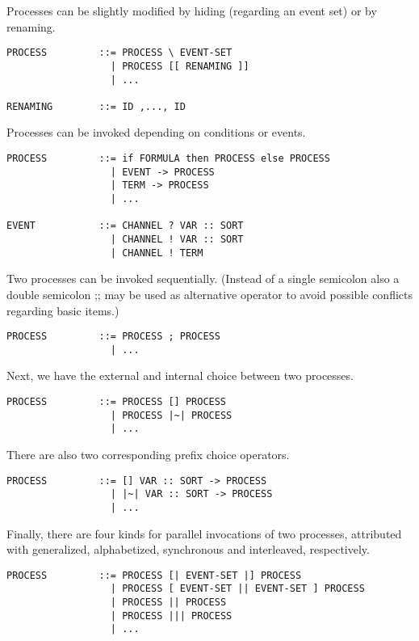 \documentclass{article}
\begin{document}
Processes can be slightly modified by hiding (regarding an event set) or by
renaming.

\begin{verbatim}
PROCESS         ::= PROCESS \ EVENT-SET
                  | PROCESS [[ RENAMING ]]
                  | ...

RENAMING        ::= ID ,..., ID
\end{verbatim}

Processes can be invoked depending on conditions or events.

\begin{verbatim}
PROCESS         ::= if FORMULA then PROCESS else PROCESS
                  | EVENT -> PROCESS
                  | TERM -> PROCESS
                  | ...

EVENT           ::= CHANNEL ? VAR :: SORT
                  | CHANNEL ! VAR :: SORT
                  | CHANNEL ! TERM
\end{verbatim}

Two processes can be invoked sequentially. (Instead of a single semicolon also
a double semicolon ;; may be used as alternative operator to avoid possible
conflicts regarding basic items.)

\begin{verbatim}
PROCESS         ::= PROCESS ; PROCESS
                  | ...
\end{verbatim}

Next, we have the external and internal choice between two processes.

\begin{verbatim}
PROCESS         ::= PROCESS [] PROCESS
                  | PROCESS |~| PROCESS
                  | ...
\end{verbatim}

There are also two corresponding prefix choice operators.
\begin{verbatim}
PROCESS         ::= [] VAR :: SORT -> PROCESS
                  | |~| VAR :: SORT -> PROCESS
                  | ...
\end{verbatim}

Finally, there are four kinds for parallel invocations of two processes,
attributed with generalized, alphabetized, synchronous and interleaved,
respectively.

\begin{verbatim}
PROCESS         ::= PROCESS [| EVENT-SET |] PROCESS
                  | PROCESS [ EVENT-SET || EVENT-SET ] PROCESS
                  | PROCESS || PROCESS
                  | PROCESS ||| PROCESS
                  | ...
\end{verbatim}
\end{document}
